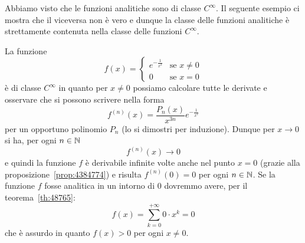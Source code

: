 Abbiamo visto che le funzioni analitiche sono di classe $C^\infty$. Il seguente
esempio ci mostra che il viceversa non è vero e dunque la classe delle funzioni
analitiche è strettamente contenuta nella classe delle funzioni $C^\infty$.

\begin{example}
La funzione
\[
  f(x) =
  \begin{cases}
    e^{-\frac 1 {x^2}} & \text{se $x\neq 0$}\\
    0 & \text{se $x=0$}
  \end{cases}
\]
è di classe $C^\infty$ in quanto per $x\neq 0$ possiamo calcolare
tutte le derivate e osservare che si possono scrivere nella forma
\[
  f^{(n)}(x) = \frac{P_n(x)}{x^{3n}}e^{-\frac 1 {x^2}}
\]
per un opportuno polinomio $P_n$ (lo si dimostri per induzione).
Dunque per $x\to 0$ si ha, per ogni $n\in {\mathbb N}$
\[
  f^{(n)}(x) \to 0
\]
e quindi la funzione $f$ è derivabile infinite volte anche nel
punto $x=0$ (grazie alla proposizione~\ref{prop:4384774})
e risulta $f^{(n)}(0) = 0$ per ogni $n\in {\mathbb N}$. Se la funzione $f$
fosse analitica in un intorno di $0$ dovremmo avere, per il teorema~\ref{th:48765}:
\[
  f(x) = \sum_{k=0}^{+\infty} 0\cdot x^k = 0
\]
che è assurdo in quanto $f(x)>0$ per ogni $x\neq 0$.
\end{example}


